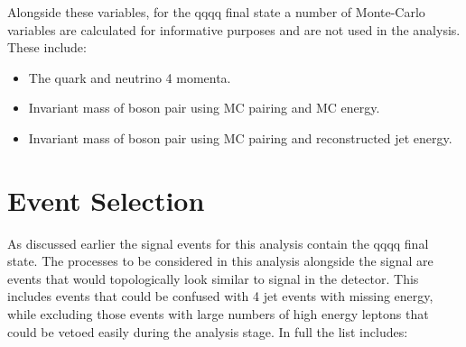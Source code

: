 Alongside these variables, for the \nu{\nu}qqqq final state a number of Monte-Carlo variables are calculated for informative purposes and are not used in the analysis. These include:
\begin{itemize}
\item The quark and neutrino 4 momenta.
\item Invariant mass of boson pair using MC pairing and MC energy.
\item Invariant mass of boson pair using MC pairing and reconstructed jet energy.
\end{itemize}

\section{Event Selection}

As discussed earlier the signal events for this analysis contain the \nu{\nu}qqqq final state. The processes to be considered in this analysis alongside the signal are events that would topologically look similar to signal in the detector. This includes events that could be confused with 4 jet events with missing energy, while excluding those events with large numbers of high energy leptons that could be vetoed easily during the analysis stage. In full the list includes:

